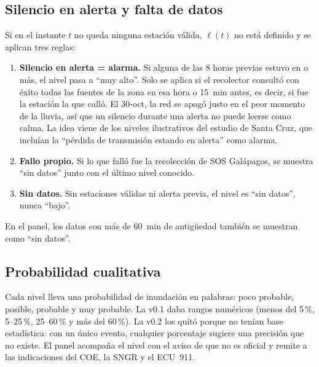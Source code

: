 \documentclass{sosg-informe}
\begin{document}
\subsection{Silencio en alerta y falta de datos}
Si en el instante $t$ no queda ninguna estación válida, $\ell(t)$ no está definido y se aplican tres reglas:
\begin{enumerate}
  \item \textbf{Silencio en alerta = alarma.} Si alguna de las 8 horas previas estuvo en \alto{} o más, el nivel pasa a \enquote{muy alto}. Solo se aplica si el recolector consultó con éxito todas las fuentes de la zona en esa hora o 15~min antes, es decir, si fue la estación la que calló. El 30-oct, la red se apagó justo en el peor momento de la lluvia, así que un silencio durante una alerta no puede leerse como calma. La idea viene de los niveles ilustrativos del estudio de Santa Cruz, que incluían la \enquote{pérdida de transmisión estando en alerta} como alarma.
  \item \textbf{Fallo propio.} Si lo que falló fue la recolección de SOS Galápagos, se muestra \enquote{sin datos} junto con el último nivel conocido.
  \item \textbf{Sin datos.} Sin estaciones válidas ni alerta previa, el nivel es \enquote{sin datos}, nunca \enquote{bajo}.
\end{enumerate}
En el panel, los datos con más de 60~min de antigüedad también se muestran como \enquote{sin datos}.

\subsection{Probabilidad cualitativa}
Cada nivel lleva una probabilidad de inundación en palabras: poco probable, posible, probable y muy probable. La v0.1 daba rangos numéricos (menos del 5\,\%, 5--25\,\%, 25--60\,\% y más del 60\,\%). La v0.2 los quitó porque no tenían base estadística: con un único evento, cualquier porcentaje sugiere una precisión que no existe. El panel acompaña el nivel con el aviso de que no es oficial y remite a las indicaciones del COE, la SNGR y el ECU~911.
\end{document}
